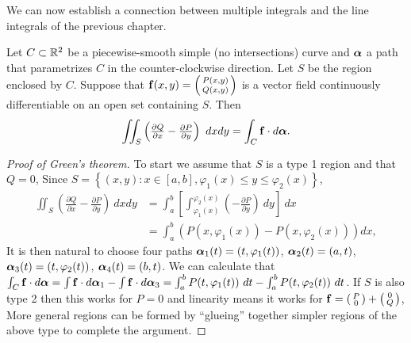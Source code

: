 We can now establish a connection between multiple integrals and the line integrals of the previous chapter.

\begin{theorem}%
    \label{thm:greens}
    Let \(C\subset\mathbb{R}^2\) be a piecewise-smooth simple (no intersections) curve and \(\boldsymbol{\alpha}\) a path that parametrizes \(C\) in the counter-clockwise direction.
    Let \(S\) be the region enclosed by \(C\).
    Suppose that \(\mathbf{f}(x,y) = \left(\begin{smallmatrix}
            P(x,y) \\ Q(x,y)
        \end{smallmatrix}\right)\) is a vector field continuously differentiable  on an open set containing \(S\).
    Then
    \[
        \iint_{S} \left(\tfrac{\partial Q}{\partial x} - \tfrac{\partial P}{\partial y}\right) \ dx dy = \int_{C} \mathbf{f} \cdot d\boldsymbol{\alpha}.
    \]
\end{theorem}

\begin{proof}[Proof of Green's theorem]
    To start we assume that \(S\) is a type 1 region and that \(Q=0\),
    Since \(S = \left\{(x,y): x \in [a,b], \varphi_1(x) \leq y \leq \varphi_2(x)\right\}\),
    \[
        \begin{aligned}
            \iint_{S}  \left(\tfrac{\partial Q}{\partial x} - \tfrac{\partial P}{\partial y}\right) \ dx dy
             & =
            \int_{a}^{b}\left[\int_{\varphi_1(x)}^{\varphi_2(x)}  (- \tfrac{\partial P}{\partial y}) \ dy\right] \ dx \\
             & = \int_{a}^{b}  (P(x,\varphi_1(x))-P(x,\varphi_2(x)))   dx,
        \end{aligned}
    \]
    It is then natural to choose four paths \(\boldsymbol{\alpha}_1(t) = (t,\varphi_1(t))\), \(\boldsymbol{\alpha}_2(t) = (a,t)\), \(\boldsymbol{\alpha}_3(t) = (t,\varphi_2(t))\), \(\boldsymbol{\alpha}_4(t) = (b,t)\).
    We can calculate that
    \(\int_{C} \mathbf{f} \cdot d\boldsymbol{\alpha} = \int \mathbf{f} \cdot d\boldsymbol{\alpha}_1 - \int \mathbf{f} \cdot d\boldsymbol{\alpha}_3 = \int_{a}^{b} P(t,\varphi_1(t)) \ dt -  \int_{a}^{b} P(t,\varphi_2(t)) \ dt \).
    If \(S\) is also type 2 then this works for \(P=0\) and linearity means it works for \(\mathbf{f} = \left(\begin{smallmatrix}
            P \\ 0
        \end{smallmatrix}\right)+\left(\begin{smallmatrix}
            0 \\ Q
        \end{smallmatrix}\right)\),
    More general regions can be formed by ``glueing'' together simpler regions of the above type to complete the argument.
\end{proof}

